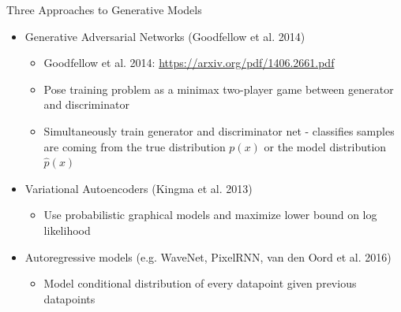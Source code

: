 \documentclass{beamer}
\begin{document}
  \begin{frame}{Three Approaches to Generative Models}
    \begin{itemize}
      \item Generative Adversarial Networks (Goodfellow et al. 2014) 
        \begin{itemize}
          \item Goodfellow et al. 2014: \url{https://arxiv.org/pdf/1406.2661.pdf}
          \item Pose training problem as a minimax two-player game between generator and discriminator
          \item Simultaneously train generator and discriminator net - classifies samples are coming from the true distribution $p(x)$ or the model distribution $\hat{p}(x)$
        \end{itemize}
      \item Variational Autoencoders (Kingma et al. 2013)
        \begin{itemize}
          \item Use probabilistic graphical models and maximize lower bound on log likelihood
        \end{itemize}
      \item Autoregressive models (e.g. WaveNet, PixelRNN, van den Oord et al. 2016)
        \begin{itemize}
          \item Model conditional distribution of every datapoint given previous datapoints
        \end{itemize}
    \end{itemize}
  \end{frame}
\end{document}
